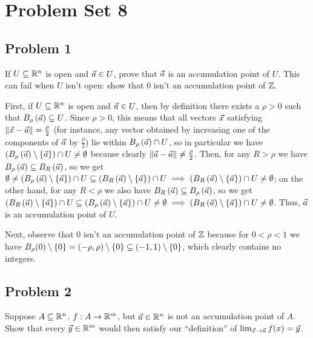 \documentclass[main.tex]{subfiles}
\begin{document}
\section{Problem Set 8}
\subsection{Problem 1}
\begin{claim}
    If $U \subseteq \mathbb R^n$ is open and $\vec{a} \in U$, prove that $\vec{a}$ is an accumulation point of $U$. This can fail when $U$ isn’t open: show that $0$ isn’t an accumulation point of $\mathbb Z$.
\end{claim}

\begin{soln}
    First, if $U\subseteq \mathbb R^n$ is open and $\vec{a}\in U$, then by definition there exists a $\rho > 0$ such that $B_\rho\left( \vec{a} \right)\subseteq U$. Since $\rho > 0$, this means that all vectors $\vec{x}$ satisfying $\left\lVert \vec{x} - \vec{a} \right\rVert = \frac{\rho}{2}$ (for instance, any vector obtained by increasing one of the components of $\vec{a}$ by $\frac{\rho}{2}$) lie within $B_\rho\left( \vec{a} \right)\cap U$, so in particular we have $\left( B_\rho\left( \vec{a} \right) \setminus \left\{ \vec{a} \right\} \right) \cap U \neq \emptyset$ because clearly $\left\lVert \vec{a} - \vec{a} \right\rVert \neq \frac{\rho}{2}$. Then, for any $R > \rho$ we have $B_\rho\left( \vec{a} \right)\subseteq B_R\left( \vec{a} \right)$, so we get $\emptyset\neq \left( B_\rho\left( \vec{a} \right) \setminus \left\{ \vec{a} \right\} \right) \cap U\subseteq \left( B_R\left( \vec{a} \right) \setminus \left\{ \vec{a} \right\} \right) \cap U\implies \left( B_R\left( \vec{a} \right) \setminus \left\{ \vec{a} \right\} \right) \cap U\neq \emptyset$; on the other hand, for any $R < \rho$ we also have $B_R\left( \vec{a} \right)\subseteq B_\rho\left( \vec{a} \right)$, so we get $\left( B_R\left( \vec{a} \right) \setminus \left\{ \vec{a} \right\} \right) \cap U\subseteq \left( B_\rho\left( \vec{a} \right) \setminus \left\{ \vec{a} \right\} \right) \cap U\neq \emptyset\implies \left( B_R\left( \vec{a} \right) \setminus \left\{ \vec{a} \right\} \right) \cap U\neq \emptyset$. Thus, $\vec{a}$ is an accumulation point of $U$.

    Next, observe that $0$ isn't an accumulation point of $\mathbb Z$ because for $0 < \rho < 1$ we have $B_\rho(0) \setminus \left\{ 0 \right\}= (-\rho, \rho)\setminus \left\{ 0 \right\} \subseteq (-1, 1) \setminus \left\{ 0 \right\}$, which clearly contains no integers.
\end{soln}
\eject

\subsection{Problem 2}
\begin{claim}
    Suppose $A \subseteq \mathbb R^n$, $f : A \to \mathbb R^m$, but $\vec{a} \in \mathbb R^n$ is not an accumulation point of $A$. Show that every $\vec{y} \in \mathbb R^m$ would then satisfy our ``definition” of $\lim_{\vec{x}\to \vec{a}} f(x) = \vec{y}$.
\end{claim}
\end{document}
